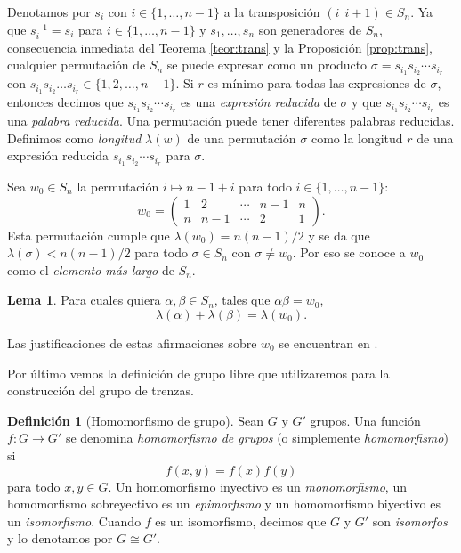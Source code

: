 \documentclass[12pt]{book}
\theoremstyle{definition}
\newtheorem{defi}{Definición}[section]
\newtheorem{lema}{Lema}[section]
\begin{document}
Denotamos por $s_i$ con $i\in\{1,\ldots,n-1\}$ a la transposición $(i\ \ i+1)\in S_n$. Ya que $s_i^{-1}= s_i$ para $i\in\{1,\ldots,n-1\}$ y $s_1,\ldots,s_n$ son generadores de $S_n$, consecuencia inmediata del Teorema \ref{teor:trans} y la Proposición \ref{prop:trans}, cualquier permutación de $S_n$ se puede expresar como un producto $\sigma = s_{i_1}s_{i_2}\cdots s_{i_r}$ con $s_{i_1}s_{i_2}\ldots s_{i_r}\in\{1,2,\ldots,n-1\}$. Si $r$ es mínimo para todas las expresiones de $\sigma$, entonces decimos que $s_{i_1}s_{i_2}\cdots s_{i_r}$ es una \textit{expresión reducida} de $\sigma$ y que $s_{i_1}s_{i_2}\cdots s_{i_r}$ es una \textit{palabra reducida}. Una permutación puede tener diferentes palabras reducidas. Definimos como \textit{longitud} $\lambda(w)$ de una permutación $\sigma$ como la longitud $r$ de una expresión reducida $s_{i_1}s_{i_2}\cdots s_{i_r}$ para $\sigma$.

Sea $w_0\in S_n$ la permutación $i\mapsto n-1+i$ para todo $i \in\{ 1,\ldots,n-1\}$:
$$w_0 = 
\begin{pmatrix} 
1 & 2 & \cdots & n-1 & n \\
n & n-1 & \cdots & 2 & 1
\end{pmatrix}
.$$
Esta permutación cumple que $\lambda(w_0)=n(n-1)/2$ y se da que $\lambda(\sigma)<n(n-1)/2$ para todo $\sigma\in S_n$ con $\sigma\neq w_0$. Por eso se conoce a $w_0$ como el \textit{elemento más largo} de $S_n$.

\begin{lema}
Para cuales quiera $\alpha,\beta\in S_n$, tales que $\alpha\beta = w_0$,
$$\lambda(\alpha)+\lambda(\beta)=\lambda(w_0).$$
\label{lema:long_per}
\end{lema}
Las justificaciones de estas afirmaciones sobre $w_0$ se encuentran en \cite{br_gr}.

Por último vemos la definición de grupo libre que utilizaremos para la construcción del grupo de trenzas.

\begin{defi}[Homomorfismo de grupo]
Sean $G$ y $G'$ grupos. Una función $f:G\rightarrow G'$ se denomina \textit{homomorfismo de grupos} (o simplemente \textit{homomorfismo}) si
$$f(x,y)=f(x)f(y)$$
para todo $x,y\in G$. Un homomorfismo inyectivo es un \textit{monomorfismo}, un homomorfismo sobreyectivo es un \textit{epimorfismo} y un homomorfismo biyectivo es un \textit{isomorfismo}. Cuando $f$ es un isomorfismo, decimos que $G$ y $G'$ son \textit{isomorfos} y lo denotamos por $G\cong G'$.
\end{defi}
\end{document}
